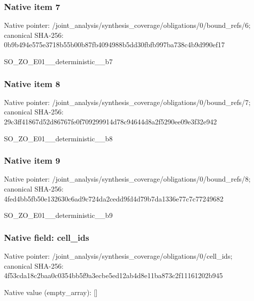 \documentclass[10pt,a4paper]{article}
\begin{document}
\subsubsection{Native item 7}
Native pointer: /joint\_\allowbreak{}analysis/synthesis\_\allowbreak{}coverage/obligations/0/bound\_\allowbreak{}refs/6; canonical SHA-256: 0b9b494e575e3718b55b00b87fb4094988b5dd30fbfb997ba738c4b9d990ef17

\begingroup\raggedright\sloppy SO\_\allowbreak{}ZO\_\allowbreak{}E01\_\allowbreak{}\_\allowbreak{}deterministic\_\allowbreak{}\_\allowbreak{}b7\par\endgroup

\subsubsection{Native item 8}
Native pointer: /joint\_\allowbreak{}analysis/synthesis\_\allowbreak{}coverage/obligations/0/bound\_\allowbreak{}refs/7; canonical SHA-256: 29c3ff41867d52d86767fe0f709299914d78c94644d8a2f5290ee09e3f32e942

\begingroup\raggedright\sloppy SO\_\allowbreak{}ZO\_\allowbreak{}E01\_\allowbreak{}\_\allowbreak{}deterministic\_\allowbreak{}\_\allowbreak{}b8\par\endgroup

\subsubsection{Native item 9}
Native pointer: /joint\_\allowbreak{}analysis/synthesis\_\allowbreak{}coverage/obligations/0/bound\_\allowbreak{}refs/8; canonical SHA-256: 4fed4bb5fb50e132630c6ad9c724da2cedd9fd4d79b7da1336e77c7c77249682

\begingroup\raggedright\sloppy SO\_\allowbreak{}ZO\_\allowbreak{}E01\_\allowbreak{}\_\allowbreak{}deterministic\_\allowbreak{}\_\allowbreak{}b9\par\endgroup

\subsubsection{Native field: cell\_\allowbreak{}ids}
Native pointer: /joint\_\allowbreak{}analysis/synthesis\_\allowbreak{}coverage/obligations/0/cell\_\allowbreak{}ids; canonical SHA-256: 4f53cda18c2baa0c0354bb5f9a3ecbe5ed12ab4d8e11ba873c2f11161202b945

Native value (empty\_\allowbreak{}array): []
\end{document}
